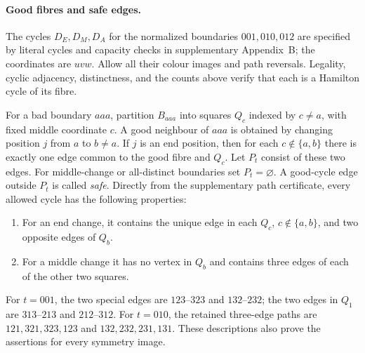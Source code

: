 \documentclass[11pt]{article}
\theoremstyle{remark}
\numberwithin{equation}{section}
\numberwithin{table}{section}
\begin{document}
\paragraph{Good fibres and safe edges.}
The cycles $D_E,D_M,D_A$ for the normalized boundaries $001,010,012$
are specified by literal cycles and capacity checks in supplementary
Appendix~B; the coordinates are $uvw$.
Allow all their colour images and path reversals. Legality, cyclic adjacency, distinctness, and the counts
above verify that each is a Hamilton cycle of its fibre.

For a bad boundary $aaa$, partition $B_{aaa}$ into squares $Q_c$ indexed
by $c\ne a$, with fixed middle coordinate $c$. A good neighbour of
$aaa$ is obtained by changing position $j$ from $a$ to $b\ne a$.
If $j$ is an end position, then for each $c\notin\{a,b\}$ there is
exactly one edge common to the good fibre and $Q_c$. Let $P_t$ consist
of these two edges. For middle-change or all-distinct boundaries set
$P_t=\varnothing$. A good-cycle edge outside $P_t$ is called \emph{safe}.
Directly from the supplementary path certificate, every allowed cycle has the following properties:
\begin{enumerate}
\item For an end change, it contains the unique edge in each
      $Q_c$, $c\notin\{a,b\}$, and two opposite edges of $Q_b$.
\item For a middle change it has no vertex in $Q_b$ and contains
      three edges of each of the other two squares.
\end{enumerate}
For $t=001$, the two special edges are $123$--$323$ and $132$--$232$;
the two edges in $Q_1$ are $313$--$213$ and $212$--$312$.
For $t=010$, the retained three-edge paths are
$121,321,323,123$ and $132,232,231,131$.
These descriptions also prove the assertions for every symmetry image.
\end{document}

